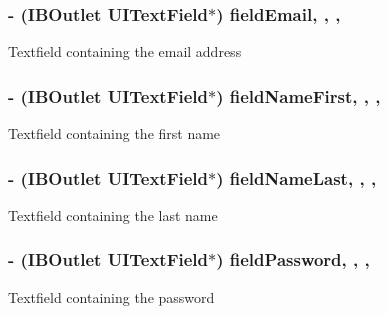 \subsubsection[{field\+Email}]{\setlength{\rightskip}{0pt plus 5cm}-\/ (I\+B\+Outlet U\+I\+Text\+Field$\ast$) field\+Email\hspace{0.3cm}{\ttfamily [read]}, {\ttfamily [write]}, {\ttfamily [nonatomic]}, {\ttfamily [strong]}}\label{category_e_s_register_view_07_08_a21999c2e9c5d101ced512c64b0e7a560}
Textfield containing the email address \hypertarget{category_e_s_register_view_07_08_af6448700b6499730b3cca5a68e6b54d5}{}
\subsubsection[{field\+Name\+First}]{\setlength{\rightskip}{0pt plus 5cm}-\/ (I\+B\+Outlet U\+I\+Text\+Field$\ast$) field\+Name\+First\hspace{0.3cm}{\ttfamily [read]}, {\ttfamily [write]}, {\ttfamily [nonatomic]}, {\ttfamily [strong]}}\label{category_e_s_register_view_07_08_af6448700b6499730b3cca5a68e6b54d5}
Textfield containing the first name \hypertarget{category_e_s_register_view_07_08_a6ccb37528064a73e8e7a1331ad8b0f81}{}
\subsubsection[{field\+Name\+Last}]{\setlength{\rightskip}{0pt plus 5cm}-\/ (I\+B\+Outlet U\+I\+Text\+Field$\ast$) field\+Name\+Last\hspace{0.3cm}{\ttfamily [read]}, {\ttfamily [write]}, {\ttfamily [nonatomic]}, {\ttfamily [strong]}}\label{category_e_s_register_view_07_08_a6ccb37528064a73e8e7a1331ad8b0f81}
Textfield containing the last name \hypertarget{category_e_s_register_view_07_08_ae7095d5eb51b8212c557ae76ee6b1268}{}
\subsubsection[{field\+Password}]{\setlength{\rightskip}{0pt plus 5cm}-\/ (I\+B\+Outlet U\+I\+Text\+Field$\ast$) field\+Password\hspace{0.3cm}{\ttfamily [read]}, {\ttfamily [write]}, {\ttfamily [nonatomic]}, {\ttfamily [strong]}}\label{category_e_s_register_view_07_08_ae7095d5eb51b8212c557ae76ee6b1268}
Textfield containing the password \hypertarget{category_e_s_register_view_07_08_a42e9a610f916fec8ad9e989c9cbcf239}{}
